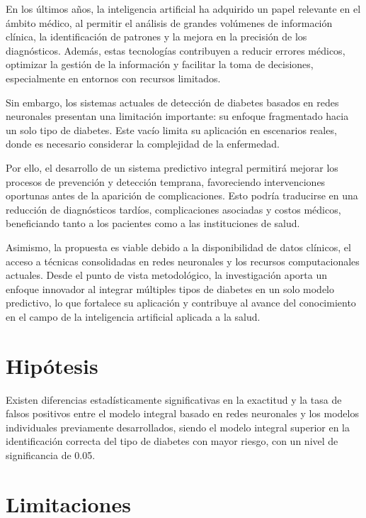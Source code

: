 En los \'ultimos a\~nos, la inteligencia artificial ha adquirido un papel relevante en el \'ambito m\'edico, al permitir el an\'alisis de grandes vol\'umenes de informaci\'on cl\'inica, la identificaci\'on de patrones y la mejora en la precisi\'on de los diagn\'osticos. Adem\'as, estas tecnolog\'ias contribuyen a reducir errores m\'edicos, optimizar la gesti\'on de la informaci\'on y facilitar la toma de decisiones, especialmente en entornos con recursos limitados.

Sin embargo, los sistemas actuales de detecci\'on de diabetes basados en redes neuronales presentan una limitaci\'on importante: su enfoque fragmentado hacia un solo tipo de diabetes. Este vac\'io limita su aplicaci\'on en escenarios reales, donde es necesario considerar la complejidad de la enfermedad.

Por ello, el desarrollo de un sistema predictivo integral permitir\'a mejorar los procesos de prevenci\'on y detecci\'on temprana, favoreciendo intervenciones oportunas antes de la aparici\'on de complicaciones. Esto podr\'ia traducirse en una reducci\'on de diagn\'osticos tard\'ios, complicaciones asociadas y costos m\'edicos, beneficiando tanto a los pacientes como a las instituciones de salud.

Asimismo, la propuesta es viable debido a la disponibilidad de datos cl\'inicos, el acceso a t\'ecnicas consolidadas en redes neuronales y los recursos computacionales actuales. Desde el punto de vista metodol\'ogico, la investigaci\'on aporta un enfoque innovador al integrar m\'ultiples tipos de diabetes en un solo modelo predictivo, lo que fortalece su aplicaci\'on y contribuye al avance del conocimiento en el campo de la inteligencia artificial aplicada a la salud.


\section{Hip\'otesis}

Existen diferencias estad\'isticamente significativas en la exactitud y la tasa de falsos positivos entre el modelo integral basado en redes neuronales y los modelos individuales previamente desarrollados, siendo el modelo integral superior en la identificaci\'on correcta del tipo de diabetes con mayor riesgo, con un nivel de significancia de 0.05.




\section{Limitaciones}

